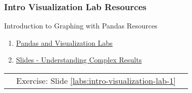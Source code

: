 \documentclass[handout, 11pt]{beamer}
\begin{document}
\begin{frame}
\frametitle{Intro Visualization Lab Resources}
{
\begin{block}{Introduction to Graphing with Pandas Resources}
\begin{enumerate}
\item \textcolor{blue}{\underline{\href{https://nickderobertis.github.io/fin-model-course/\_static/Materials for Lab Exercises/Visualization/Pandas and Visualization Labs.ipynb}{Pandas and Visualization Labs}}}
\item \textcolor{blue}{\underline{\href{https://nickderobertis.github.io/fin-model-course/\_static/generated/pdfs/S6 Understanding Complex Results.pdf}{Slides - Understanding Complex Results}}}
\end{enumerate}
\vfill
\begin{tabular*}{\textwidth}{@{\extracolsep{\fill}}ccc}
\toprule
\hfill & Exercise: Slide \textcolor{blue}{\underline{\ref{labs:intro-visualization-lab-1}}} & \hfill\\

\end{tabular*}
\end{block}
}
\label{labs:intro-visualization-lab-1-resources}
\end{frame}
\setcounter{framenumber}{\value{finalframe}}
\end{document}
